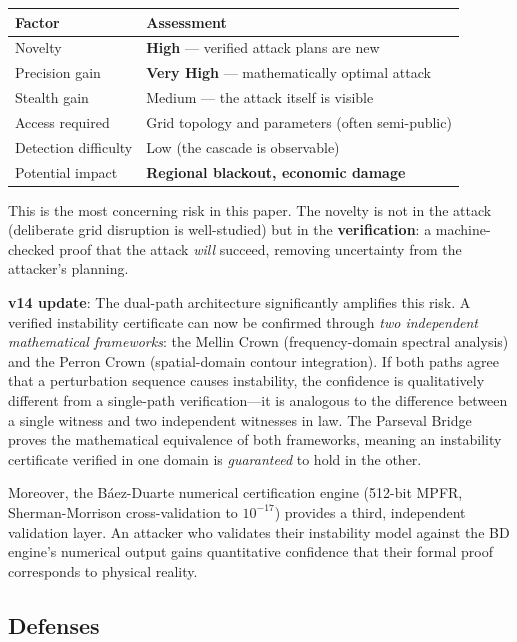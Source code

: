 \documentclass[11pt,a4paper]{article}
\begin{document}
\begin{center}
\begin{tabular}{@{}ll@{}}
\toprule
\textbf{Factor} & \textbf{Assessment} \\
\midrule
Novelty & \textbf{High} --- verified attack plans are new \\
Precision gain & \textbf{Very High} --- mathematically optimal attack \\
Stealth gain & Medium --- the attack itself is visible \\
Access required & Grid topology and parameters (often semi-public) \\
Detection difficulty & Low (the cascade is observable) \\
Potential impact & \textbf{Regional blackout, economic damage} \\
\bottomrule
\end{tabular}
\end{center}

This is the most concerning risk in this paper. The novelty is not
in the attack (deliberate grid disruption is well-studied) but in
the \textbf{verification}: a machine-checked proof that the attack
\emph{will} succeed, removing uncertainty from the attacker's
planning.

\textbf{v14 update}: The dual-path architecture significantly amplifies
this risk. A verified instability certificate can now be confirmed
through \emph{two independent mathematical frameworks}: the Mellin
Crown (frequency-domain spectral analysis) and the Perron Crown
(spatial-domain contour integration). If both paths agree that a
perturbation sequence causes instability, the confidence is
qualitatively different from a single-path verification---it is
analogous to the difference between a single witness and two
independent witnesses in law. The Parseval Bridge proves the
mathematical equivalence of both frameworks, meaning an instability
certificate verified in one domain is \emph{guaranteed} to hold in
the other.

Moreover, the B\'aez-Duarte numerical certification engine (512-bit
MPFR, Sherman-Morrison cross-validation to $10^{-17}$) provides a
third, independent validation layer. An attacker who validates their
instability model against the BD engine's numerical output gains
quantitative confidence that their formal proof corresponds to
physical reality.

\subsection{Defenses}
\end{document}
